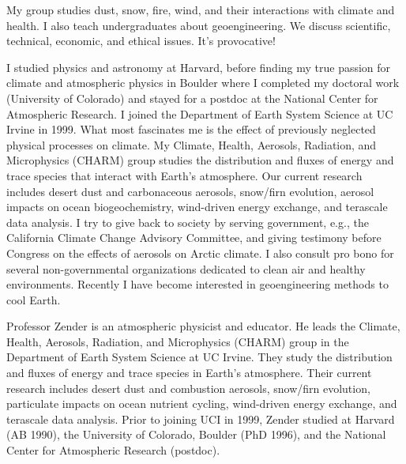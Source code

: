 \documentclass[11pt,twoside]{article}
\begin{document}
{{%
My group studies dust, snow, fire, wind, and their interactions with 
climate and health. I also teach undergraduates about geoengineering.
We discuss scientific, technical, economic, and ethical issues.
It's provocative!

I studied physics and astronomy at Harvard, before finding my true
passion for climate and atmospheric physics in Boulder where I
completed my doctoral work (University of Colorado) and stayed for a 
postdoc at the National Center for Atmospheric Research.
I joined the Department of Earth System Science at UC Irvine in 1999.
What most fascinates me is the effect of previously neglected physical
processes on climate. My Climate, Health, Aerosols, Radiation, and
Microphysics (CHARM) group studies the distribution and fluxes of
energy and trace species that interact with Earth's atmosphere. 
Our current research includes desert dust and carbonaceous aerosols,
snow/firn evolution, aerosol impacts on ocean biogeochemistry,
wind-driven energy exchange, and terascale data analysis. 
I try to give back to society by serving government, e.g., the
California Climate Change Advisory Committee, and giving testimony
before Congress on the effects of aerosols on Arctic climate.  
I also consult pro bono for several non-governmental organizations
dedicated to clean air and healthy environments. Recently I have
become interested in geoengineering methods to cool Earth.

Professor Zender is an atmospheric physicist and educator.  
He leads the Climate, Health, Aerosols, Radiation, and Microphysics
(CHARM) group in the Department of Earth System Science at UC Irvine.
They study the distribution and fluxes of energy and trace species
in Earth's atmosphere.  Their current research includes desert dust
and combustion aerosols, snow/firn evolution, particulate impacts on
ocean nutrient cycling, wind-driven energy exchange, and terascale
data analysis.  Prior to joining UCI in 1999, Zender studied at
Harvard (AB 1990), the University of Colorado, Boulder (PhD 1996), and
the National Center for Atmospheric Research (postdoc).

}}
\end{document}
